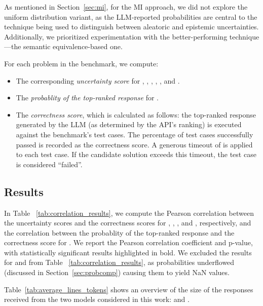 As mentioned in Section~\ref{sec:mi}, for the MI approach, we did not explore the uniform distribution variant, as the LLM-reported probabilities are central to the technique being used to distinguish between aleatoric and epistemic uncertainties. Additionally, we prioritized experimentation with the better-performing technique---the semantic equivalence-based one.

For each problem in the benchmark, we compute:
\begin{itemize}[leftmargin=*]
\item The corresponding \emph{uncertainty score} for \SESymbolicRaw, \SESymbolic, \SESymbolicUnif, \SEOriginal, \MISymbolicRaw, \MISymbolic and \MIOriginal.
  \item The \emph{probablity of the top-ranked response} for \LLMProbability. 
  \item The \emph{correctness score}, which is calculated as follows: the top-ranked response generated by the LLM (as determined by the API's ranking) is executed against the benchmark's test cases. The percentage of test cases successfully passed is recorded as the correctness score. A generous timeout of \CorrectnessTimeout is applied to each test case. If the candidate solution exceeds this timeout, the test case is considered ``failed''.
\end{itemize}


\subsection{Results}\label{sec:results}

In Table ~\ref{tab:correlation_results}, we compute the Pearson correlation between the uncertainty scores and the correctness scores for \SESymbolic, \SESymbolicUnif, \SEOriginal, \MISymbolic and \MIOriginal, respectively, and the correlation between the probablity of the top-ranked response and the correctness score for \LLMProbability. We report the Pearson correlation coefficient and p-value, with statistically significant results highlighted in bold.
%
We excluded the results for \SESymbolicRaw and \MISymbolicRaw from Table ~\ref{tab:correlation_results}, as probabilities underflowed (discussed in Section~\ref{sec:probcomp}) causing them to yield NaN values.

Table~\ref{tab:average_lines_tokens} shows an overview of the size of the responses received from the two models considered in this work: \gptturbo and \codegenmonoC. %

